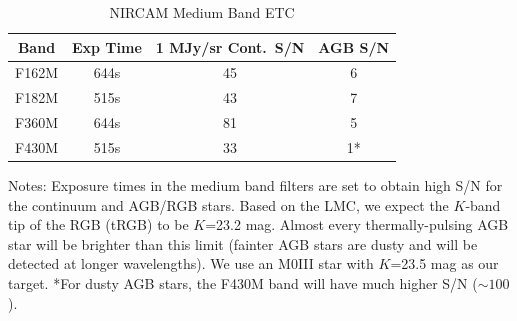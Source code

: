 \documentclass[12pt]{article}
\begin{document}



\begin{table}
\vspace{-0.3in}
\small
\caption{NIRCAM Medium Band ETC}\label{tab:medium}
\vspace{-0.4in}
\begin{center}
\begin{tabular}{|c|c|c|c|}
\hline
Band & Exp Time & 1 MJy/sr Cont.\ S/N & AGB S/N \\
\hline
F162M & 644s & 45 & 6 \\
\hline
F182M & 515s & 43 & 7 \\
 \hline
 F360M & 644s & 81 & 5 \\
 \hline
 F430M & 515s & 33 & 1* \\
 \hline 
\end{tabular}
\end{center}
\vspace{-0.1in}
Notes: Exposure times in the medium band filters are set to obtain high S/N for the continuum and AGB/RGB stars.  Based on the LMC, we expect the $K$-band tip of the RGB (tRGB) to be $K$=23.2 mag.  Almost every thermally-pulsing AGB star will be brighter than this limit (fainter AGB stars are dusty and will be detected at longer wavelengths).  We use an M0III star with $K$=23.5 mag as our target. *For dusty AGB stars, the F430M band will have much higher S/N ($\sim100$).
\end{table}%
\end{document}
